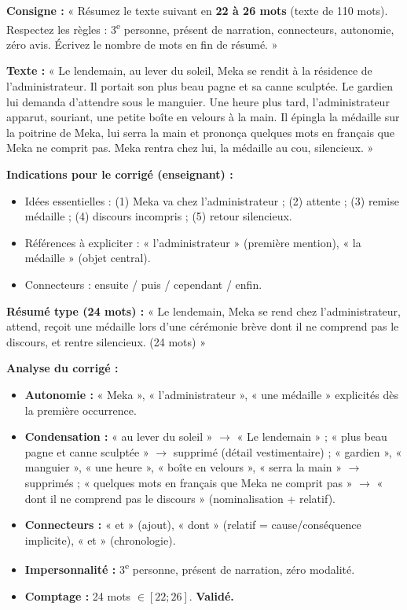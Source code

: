 \documentclass[11pt]{article}
\begin{document}
\begin{exercice}
\textbf{Consigne :} « Résumez le texte suivant en \textbf{22 à 26 mots} (texte de 110 mots). Respectez les règles : 3\textsuperscript{e} personne, présent de narration, connecteurs, autonomie, zéro avis. Écrivez le nombre de mots en fin de résumé. »

\textbf{Texte :}
« Le lendemain, au lever du soleil, Meka se rendit à la résidence de l'administrateur. Il portait son plus beau pagne et sa canne sculptée. Le gardien lui demanda d'attendre sous le manguier. Une heure plus tard, l'administrateur apparut, souriant, une petite boîte en velours à la main. Il épingla la médaille sur la poitrine de Meka, lui serra la main et prononça quelques mots en français que Meka ne comprit pas. Meka rentra chez lui, la médaille au cou, silencieux. »

\textbf{Indications pour le corrigé (enseignant) :}
\begin{itemize}
    \item Idées essentielles : (1) Meka va chez l'administrateur ; (2) attente ; (3) remise médaille ; (4) discours incompris ; (5) retour silencieux.
    \item Références à expliciter : « l'administrateur » (première mention), « la médaille » (objet central).
    \item Connecteurs : ensuite / puis / cependant / enfin.
\end{itemize}
\end{exercice}

\begin{corrige}
\textbf{Résumé type (24 mots) :}
« Le lendemain, Meka se rend chez l'administrateur, attend, reçoit une médaille lors d'une cérémonie brève dont il ne comprend pas le discours, et rentre silencieux. (24 mots) »

\textbf{Analyse du corrigé :}
\begin{itemize}
    \item \textbf{Autonomie :} « Meka », « l'administrateur », « une médaille » explicités dès la première occurrence.
    \item \textbf{Condensation :} « au lever du soleil » $\to$ « Le lendemain » ; « plus beau pagne et canne sculptée » $\to$ supprimé (détail vestimentaire) ; « gardien », « manguier », « une heure », « boîte en velours », « serra la main » $\to$ supprimés ; « quelques mots en français que Meka ne comprit pas » $\to$ « dont il ne comprend pas le discours » (nominalisation + relatif).
    \item \textbf{Connecteurs :} « et » (ajout), « dont » (relatif = cause/conséquence implicite), « et » (chronologie).
    \item \textbf{Impersonnalité :} 3\textsuperscript{e} personne, présent de narration, zéro modalité.
    \item \textbf{Comptage :} 24 mots $\in [22; 26]$. \textbf{Validé.}
\end{itemize}
\end{corrige}
\end{document}
